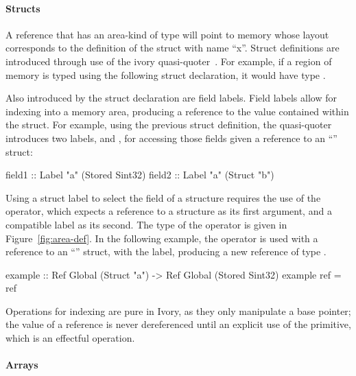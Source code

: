 \paragraph{Structs} A reference that has an area-kind of type 
will point to memory whose layout corresponds to the definition of the struct
with name ``x''.  Struct definitions are introduced through use of the ivory
quasi-quoter~\cite{quoted}.  For example, if a region of memory is typed using
the following struct declaration, it would have type .

\begin{code}
\end{code}

Also introduced by the struct declaration are field labels.  Field labels allow
for indexing into a memory area, producing a reference to the value contained
within the struct.  For example, using the previous struct definition, the
quasi-quoter introduces two labels,  and , for accessing
those fields given a reference to an ``'' struct:

\begin{code}
field1 :: Label "a" (Stored Sint32)
field2 :: Label "a" (Struct "b")
\end{code}

Using a struct label to select the field of a structure requires the use of the
\cd{(\mytilde>)} operator, which expects a reference to a structure as its first
argument, and a compatible label as its second.  The type of the
\cd{(\mytilde>)} operator is given in Figure~\ref{fig:area-def}.  In the
following example, the \cd{(\mytilde>)} operator is used with a reference to an
``'' struct, with the  label, producing a new reference of type
.

\begin{code}
example :: Ref Global (Struct "a")
        -> Ref Global (Stored Sint32)
example ref = ref %
\end{code}

Operations for indexing are pure in Ivory, as they only manipulate a base
pointer; the value of a reference is never dereferenced until an explicit use of
the  primitive, which is an effectful operation.

\paragraph{Arrays}

